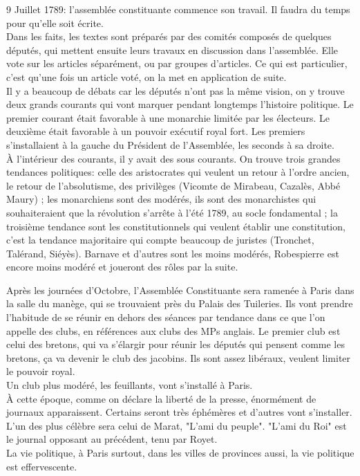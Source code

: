 \documentclass[10pt, a4paper, openany]{book}
\begin{document}
9 Juillet 1789: l'assemblée constituante commence son travail. Il faudra du temps pour qu'elle soit écrite. \\
Dans les faits, les textes sont préparés par des comités composés de quelques députés, qui mettent ensuite leurs travaux en discussion dans l'assemblée. Elle vote sur les articles séparément, ou par groupes d'articles. Ce qui est particulier, c'est qu'une fois un article voté, on la met en application de suite. \\
Il y a beaucoup de débats car les députés n'ont pas la même vision, on y trouve deux grands courants qui vont marquer pendant longtemps l'histoire politique. Le premier courant était favorable à une monarchie limitée par les électeurs. Le deuxième était favorable à un pouvoir exécutif royal fort. Les premiers s'installaient à la gauche du Président de l'Assemblée, les seconds à sa droite. \\
À l'intérieur des courants, il y avait des sous courants. On trouve trois grandes tendances politiques: celle des aristocrates qui veulent un retour à l'ordre ancien, le retour de l'absolutisme, des privilèges (Vicomte de Mirabeau, Cazalès, Abbé Maury) ; les monarchiens sont des modérés, ils sont des monarchistes qui souhaiteraient que la révolution s'arrête à l'été 1789, au socle fondamental ; la troisième tendance sont les constitutionnels qui veulent établir une constitution, c'est la tendance majoritaire qui compte beaucoup de juristes (Tronchet, Talérand, Siéyès). Barnave et d'autres sont les moins modérés, Robespierre est encore moins modéré et joueront des rôles par la suite. 


Après les journées d'Octobre, l'Assemblée Constituante sera ramenée à Paris dans la salle du manège, qui se trouvaient près du Palais des Tuileries. Ils vont prendre l'habitude de se réunir en dehors des séances par tendance dans ce que l'on appelle des clubs, en références aux clubs des MPs anglais. Le premier club est celui des bretons, qui va s'élargir pour réunir les députés qui pensent comme les bretons, ça va devenir le club des jacobins. Ils sont assez libéraux, veulent limiter le pouvoir royal. \\
Un club plus modéré, les feuillants, vont s'installé à Paris. \\
À cette époque, comme on déclare la liberté de la presse, énormément de journaux apparaissent. Certains seront très éphémères et d'autres vont s'installer. L'un des plus célèbre sera celui de Marat, "L'ami du peuple". "L'ami du Roi" est le journal opposant au précédent, tenu par Royet. \\
La vie politique, à Paris surtout, dans les villes de provinces aussi, la vie politique est effervescente. 
\end{document}
